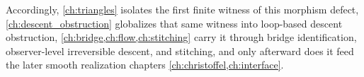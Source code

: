 Accordingly, \cref{ch:triangles} isolates the first finite witness of
this morphism defect, \cref{ch:descent_obstruction} globalizes that
same witness into loop-based descent obstruction,
\cref{ch:bridge,ch:flow,ch:stitching} carry it through bridge
identification, observer-level irreversible descent, and stitching,
and only afterward does it feed the later smooth realization
chapters \cref{ch:christoffel,ch:interface}.

\begin{chapterclosing}
\end{chapterclosing}
